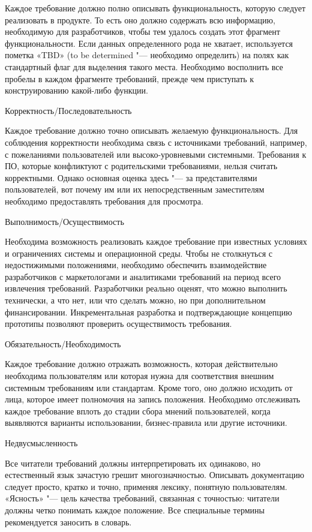 \documentclass{../industrial-development}
\begin{document}
Каждое требование должно полно описывать функциональность, которую следует реализовать в продукте. То есть оно должно содержать
всю информацию, необходимую для разработчиков, чтобы тем удалось создать этот фрагмент функциональности. Если данных определенного рода не хватает, используется пометка «TBD» (to be determined "--- необходимо определить) на полях как стандартный флаг для выделения такого места. Необходимо восполнить все пробелы в каждом фрагменте требований, прежде чем приступать к конструированию какой-либо функции.

\alert{Корректность/Последовательность}

Каждое требование должно точно описывать желаемую функциональность. Для соблюдения корректности необходима связь с источниками требований, например, с пожеланиями пользователей или высоко-уровневыми системными. Требования к ПО, которые конфликтуют с родительскими требованиями, нельзя считать корректными. Однако основная оценка здесь "--- за представителями пользователей, вот почему им или их непосредственным заместителям необходимо предоставлять требования для просмотра.

\alert{Выполнимость/Осуществимость}

Необходима возможность реализовать каждое требование при известных условиях и ограничениях системы и операционной среды.
Чтобы не столкнуться с недостижимыми положениями, необходимо обеспечить взаимодействие разработчиков с маркетологами и аналитиками требований на период всего извлечения требований. Разработчики реально оценят, что можно выполнить технически, а что нет, или что сделать можно, но при дополнительном финансировании. Инкрементальная разработка и подтверждающие концепцию прототипы позволяют проверить осуществимость требования.

\alert{Обязательность/Необходимость}

Каждое требование должно отражать возможность, которая действительно необходима пользователям или которая нужна для соответствия внешним системным требованиям или стандартам. Кроме того, оно должно исходить от лица, которое имеет полномочия на запись положения. Необходимо отслеживать каждое требование вплоть до стадии сбора мнений пользователей, когда выявляются варианты использовании, бизнес-правила или другие источники.

\alert{Недвусмысленность}

Все читатели требований должны интерпретировать их одинаково, но естественный язык зачастую грешит многозначностью. Описывать документацию следует просто, кратко и точно, применяя лексику, понятную пользователям. «Ясность» "--- цель качества требований, связанная с точностью: читатели должны четко понимать каждое положение. Все специальные термины рекомендуется заносить в словарь.
\end{document}
